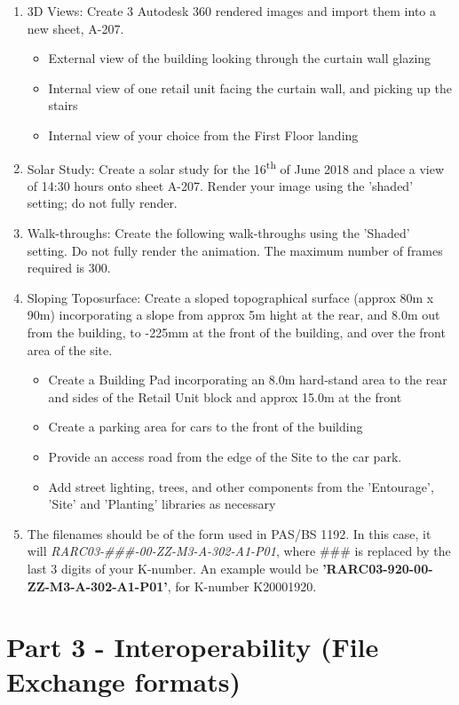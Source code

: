 \begin{enumerate}
	\item 3D Views: Create 3 Autodesk 360 rendered images and import them into a new sheet, A-207.
	\begin{itemize}
		\item External view of the building looking through the curtain wall glazing
		\item Internal view of one retail unit facing the curtain wall, and picking up the stairs
		\item Internal view of your choice from the First Floor landing 
	\end{itemize} 
	\item Solar Study: Create a solar study for the 16\textsuperscript{th} of June 2018 and place a view of 14:30 hours onto sheet A-207.  Render your image using the 'shaded' setting; do not fully render.  
	\item Walk-throughs: Create the following walk-throughs using the 'Shaded' setting.  Do not fully render the animation.  The maximum number of frames required is 300.
	\item Sloping Toposurface: Create a sloped topographical surface (approx 80m x 90m) incorporating a slope from approx 5m hight at the rear, and 8.0m out from the building, to -225mm at the front of the building, and over the front area of the site.
	\begin{itemize}
		\item Create a Building Pad incorporating an 8.0m hard-stand area to the rear and sides of the Retail Unit block and approx 15.0m at the front
		\item Create a parking area for cars to the front of the building
		\item Provide an access road from the edge of the Site to the car park.
		\item Add street lighting, trees, and other components from the 'Entourage', 'Site' and 'Planting' libraries as necessary 
	\end{itemize}
	\item The filenames should be of the form used in PAS/BS 1192.  In this case, it will \textit{RARC03-\#\#\#-00-ZZ-M3-A-302-A1-P01}, where \#\#\# is replaced by the last 3 digits of your K-number. An example would be \textbf{'RARC03-920-00-ZZ-M3-A-302-A1-P01'}, for K-number K20001920.
\end{enumerate}

\newpage

\section*{Part 3 - Interoperability (File Exchange formats)}

